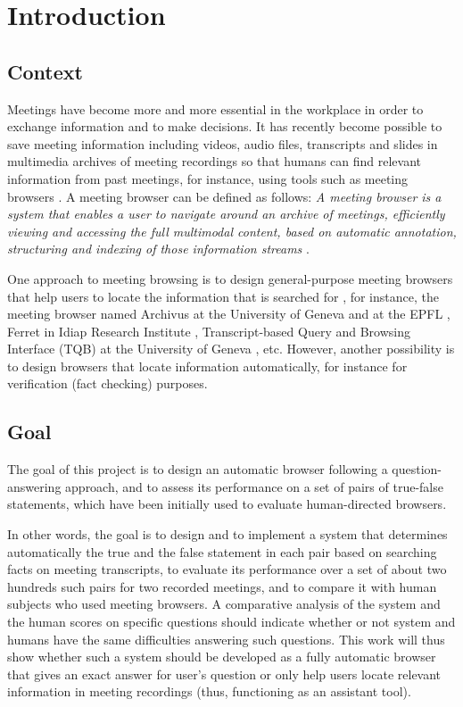 \newpage
\chapter{Introduction}

\section{Context}
Meetings have become more and more essential in the workplace in order to exchange information and to make decisions. It has recently become possible to save meeting information including videos, audio files, transcripts and slides in multimedia archives of meeting recordings so that humans can find relevant information from past meetings, for instance, using tools such as meeting browsers \cite{popescubelis:tbe}.  A meeting browser can be defined as follows: \textit{A meeting browser is a system that enables a user to navigate around an archive of meetings, efficiently viewing and accessing the full multimodal content, based on automatic annotation, structuring and indexing of those information streams} \cite{mccowan2005amc}. 

One approach to meeting browsing is to design general-purpose meeting browsers that help users to locate the information that is searched for \cite{lalanne2005imm}, for instance, the meeting browser named Archivus at the University of Geneva and at the EPFL \cite{lisowska2004asa}, Ferret in Idiap Research Institute \cite{wellner2004brm}, Transcript-based Query and Browsing Interface (TQB) at the University of Geneva \cite{popescubelis:tam}, etc. However, another possibility is to design browsers that locate information automatically, for instance for verification (fact checking) purposes.

\section{Goal }

The goal of this project is to design an automatic browser following a question-answering approach, and to assess its performance on a set of pairs of true-false statements, which have been initially used to evaluate human-directed browsers.

In other words, the goal is to design and to implement a system that determines automatically the true and the false statement in each pair based on searching facts on meeting transcripts, to evaluate its performance over a set of about two hundreds such pairs for two recorded meetings, and to compare it with human subjects who used meeting browsers. A comparative analysis of the system and the human scores on specific questions should indicate whether or not system and humans have the same difficulties answering such questions. This work will thus show whether such a system should be developed as a fully automatic browser that gives an exact answer for user's question or only help users locate relevant information in meeting recordings (thus, functioning as an assistant tool).

